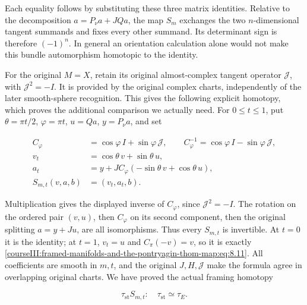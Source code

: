 Each equality follows by substituting these three matrix identities. Relative to the decomposition \(a=P_\nu a+JQa\), the map \(S_m\) exchanges the two \(n\)-dimensional tangent summands and fixes every other summand. Its determinant sign is therefore \((-1)^n\). In general an orientation calculation alone would not make this bundle automorphism homotopic to the identity.

For the original \(M=X\), retain its original almost-complex tangent operator \(\mathcal J\), with \(\mathcal J^2=-I\). It is provided by the original complex charts, independently of the later smooth-sphere recognition. This gives the following explicit homotopy, which proves the additional comparison we actually need. For \(0\leq t\leq1\), put \(\theta=\pi t/2\), \(\varphi=\pi t\), \(u=Qa\), \(y=P_\nu a\), and set

\begin{equation}
\begin{aligned}
 C_\varphi&=\cos\varphi\,I+\sin\varphi\,\mathcal J,\qquad
       C_\varphi^{-1}=\cos\varphi\,I-\sin\varphi\,\mathcal J,\\
 v_t&=\cos\theta\,v+\sin\theta\,u,\\
 a_t&=y+J C_\varphi(-\sin\theta\,v+\cos\theta\,u),\\
 S_{m,t}(v,a,b)&=(v_t,a_t,b).
 \end{aligned}
 \label{courseIII:framed-manifolds-and-the-pontryagin-thom-map:eq:8.12}
\end{equation}

Multiplication gives the displayed inverse of \(C_\varphi\), since \(\mathcal J^2=-I\). The rotation on the ordered pair \((v,u)\), then \(C_\varphi\) on its second component, then the original splitting \(a=y+Ju\), are all isomorphisms. Thus every \(S_{m,t}\) is invertible. At \(t=0\) it is the identity; at \(t=1\), \(v_t=u\) and \(C_\pi(-v)=v\), so it is exactly \eqref{courseIII:framed-manifolds-and-the-pontryagin-thom-map:eq:8.11}. All coefficients are smooth in \(m,t\), and the original \(J,H,\mathcal J\) make the formula agree in overlapping original charts. We have proved the actual framing homotopy

\begin{equation}
\tau_{\mathrm{st}}S_{m,t}:\quad
                  \tau_{\mathrm{st}}\simeq\tau_E.
 \label{courseIII:framed-manifolds-and-the-pontryagin-thom-map:eq:8.13}
\end{equation}

